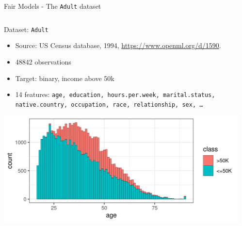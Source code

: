 \begin{frame}{Fair Models - The \texttt{Adult} dataset}
\begin{columns}
\begin{column}{0.4\textwidth}
Dataset: \texttt{Adult}
\begin{itemize}
  \footnotesize
  \item  Source: US Census database, 1994, \url{https://www.openml.org/d/1590}.
  \item 48842 observations
  \item Target: binary, income above 50k
  \item 14 features: \texttt{age, education, hours.per.week, marital.status, native.country, occupation, race, relationship, sex, \ldots}
\end{itemize}
\includegraphics[scale = 0.45]{images/dataset_adult_age_sex.png}
\end{column}%
\begin{column}{0.6\textwidth}


\end{column}
\end{columns}
\end{frame}
